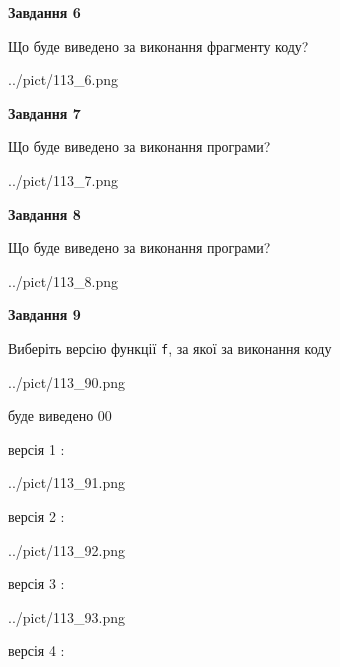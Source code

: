 \documentclass[12pt, ukrainian]{article}
\def\code#1{\Verb!#1!}
\begin{document}
{\begin {large}
{\begin {center}\textbf{Завдання 6}\end {center}}

Що буде виведено за виконання фрагменту коду?\par
\begin{center}
	{../pict/113_6.png}
\end{center}
\newpage

{\begin {center}\textbf{Завдання 7}\end {center}}

Що буде виведено за виконання програми?\par
\begin{center}
	{../pict/113_7.png}
\end{center}
\newpage

{\begin {center}\textbf{Завдання 8}\end {center}}

Що буде виведено за виконання програми?\par
\begin{center}
	{../pict/113_8.png}
\end{center}
\newpage

{\begin {center}\textbf{Завдання 9}\end {center}}

Виберіть версію функції \code{f}, за якої за виконання коду
\begin{center}
	{../pict/113_90.png}
\end{center}
буде виведено 00

\vspace{5mm}
версія 1 :

\begin{center}
	{../pict/113_91.png}
\end{center}
версія 2 :

\begin{center}
	{../pict/113_92.png}
\end{center}
версія 3 :

\begin{center}
	{../pict/113_93.png}
\end{center}
версія 4 :


\end{large}}
\end{document}
